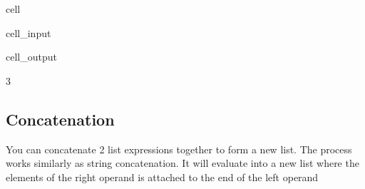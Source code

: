 \documentclass[letterpaper,10pt,english]{jupyterBook}
\begin{document}
\begin{sphinxuseclass}{cell}\begin{sphinxVerbatimInput}

\begin{sphinxuseclass}{cell_input}
\begin{sphinxVerbatim}[commandchars=\\\{\}]
\end{sphinxVerbatim}

\end{sphinxuseclass}\end{sphinxVerbatimInput}
\begin{sphinxVerbatimOutput}

\begin{sphinxuseclass}{cell_output}
\begin{sphinxVerbatim}[commandchars=\\\{\}]
3
\end{sphinxVerbatim}

\end{sphinxuseclass}\end{sphinxVerbatimOutput}

\end{sphinxuseclass}

\subsection{Concatenation}
\label{\detokenize{datatypes:id1}}
\sphinxAtStartPar
You can concatenate 2 list expressions together to form a new list. The process works similarly as string concatenation. It will evaluate into a new list where the elements of the right operand is attached to the end of the left operand
\end{document}
